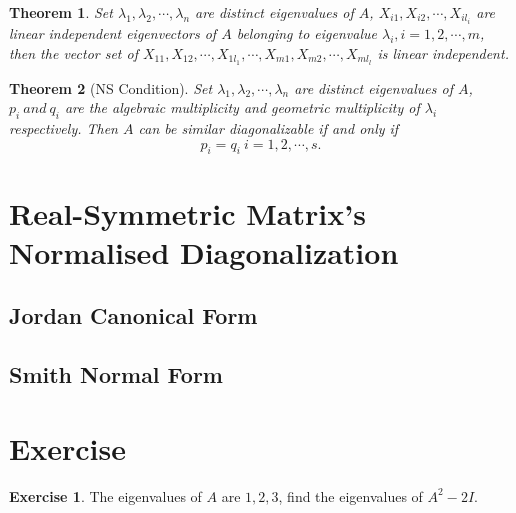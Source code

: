 \documentclass{article}
\newtheorem{theorem}{Theorem}[section]
\theoremstyle{definition}
\newtheorem{exe}{Exercise}[section]
\begin{document}
\begin{theorem}
Set $\lambda_{1},\lambda_{2},\cdots,\lambda_{n}$ are distinct eigenvalues of $A$, $X_{i1},X_{i2},\cdots,X_{il_{i}}$ 
are linear independent eigenvectors of $A$ belonging to eigenvalue $\lambda_{i},i=1,2,\cdots,m$, then the vector set of $X_{11},X_{12},\cdots,X_{1l_{1}},\cdots,X_{m1},X_{m2},\cdots,X_{ml_{l}}$ is linear independent.
\end{theorem}

\begin{theorem}[NS Condition]
    Set $\lambda_{1},\lambda_{2},\cdots,\lambda_{n}$ are distinct eigenvalues of $A$, $p_{i}\ and\ q_{i}$ are the algebraic multiplicity and geometric multiplicity of $\lambda_{i}$ respectively.
    Then $A$ can be similar diagonalizable if and only if
    $$p_{i}=q_{i}\ i=1,2,\cdots,s.$$
\end{theorem}





















\section{Real-Symmetric Matrix's Normalised Diagonalization}



\subsection{Jordan Canonical Form}

\subsection{Smith Normal Form}








\newpage
\section{Exercise}

\begin{exe}
The eigenvalues of $A$ are $1,2,3$, find the eigenvalues of $A^{2}-2I$.
\end{exe}
\end{document}
